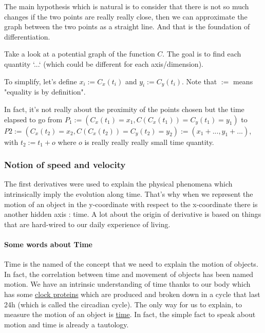 \documentclass[12pt]{article}
\begin{document}
The main hypothesis which is natural is to consider that there is not so much changes if the two points are really really close, then we can approximate the graph between the two points as a straight line. And that is the foundation of differentiation.

Take a look at a potential graph of the function $C$. The goal is to find each quantity `...` (which could be different for each axis/dimension).

\begin{figure}[H]
 \centering
 
\end{figure}

To simplify, let's define $x_i:=C_x(t_i)$ and $y_i:=C_y(t_i)$. Note that $:=$ means "equality is by definition".

In fact, it's not really about the proximity of the points chosen but the time elapsed to go from $P_1:=(C_x(t_1)=x_1, C(C_x(t_1))=C_y(t_1)=y_1)$ to $P2:=(C_x(t_2)=x_2, C(C_x(t_2))=C_y(t_2)=y_2) := (x_1+..., y_1+...)$, with $t_2 := t_1 + o$ where $o$ is really really really small time quantity. 

\subsubsection{Notion of speed and velocity}

The first derivatives were used to explain the physical phenomena which intrinsically imply the evolution along time. That's why when we represent the motion of an object in the y-coordinate with respect to the x-coordinate there is another hidden axis : time.
\newline
A lot about the origin of derivative is based on things that are hard-wired to our daily experience of living.


\paragraph{Some words about Time}


Time is the named of the concept that we need to explain the motion of objects. In fact, the correlation between time and movement of objects has been named motion.
We have an intrinsic understanding of time thanks to our body which has some \href{https://kids.frontiersin.org/articles/10.3389/frym.2019.00005}{clock proteins} which are  produced and broken down in a cycle that last 24h (which is called the circadian cycle). The only way for us to explain, to measure the motion of an object is \href{https://iep.utm.edu/aristotle-motion/\#H3}{time}. In fact, the simple fact to speak about motion and time is already a tautology.
\end{document}
